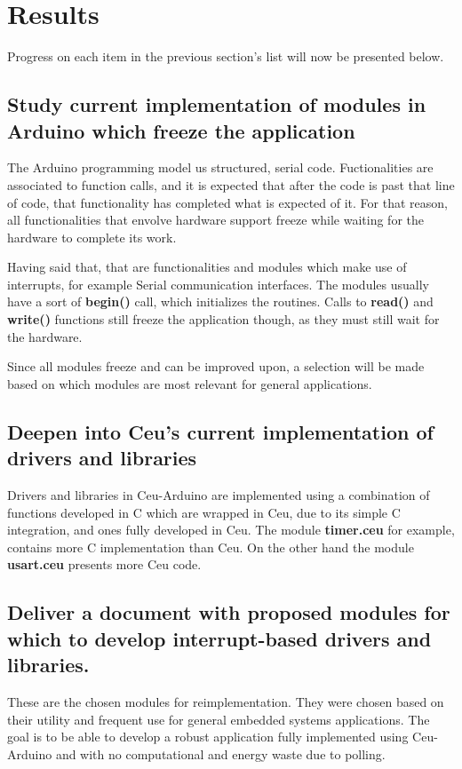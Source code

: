 \documentclass{article}
\begin{document}
\section{Results}
\tab Progress on each item in the previous section's list will now be presented below.
\subsection{Study current implementation of modules in Arduino which freeze the application}
\tab The Arduino programming model us structured, serial code. Fuctionalities are associated to function calls, and it is expected that after the code is past that line of code, that functionality has completed what is expected of it. For that reason, all functionalities that envolve hardware support freeze while waiting for the hardware to complete its work.
\par Having said that, that are functionalities and modules which make use of interrupts, for example Serial communication interfaces. The modules usually have a sort of \textbf{begin()} call, which initializes the routines. Calls to \textbf{read()} and \textbf{write()} functions still freeze the application though, as they must still wait for the hardware.
\par Since all modules freeze and can be improved upon, a selection will be made based on which modules are most relevant for general applications.
\subsection{Deepen into Ceu's current implementation of drivers and libraries}
\tab Drivers and libraries in Ceu-Arduino are implemented using a combination of functions developed in C which are wrapped in Ceu, due to its simple C integration, and ones fully developed in Ceu. The module \textbf{timer.ceu} for example, contains more C implementation than Ceu. On the other hand the module \textbf{usart.ceu} presents more Ceu code.
\subsection{Deliver a document with proposed modules for which to develop interrupt-based drivers and libraries.}
\tab These are the chosen modules for reimplementation. They were chosen based on their utility and frequent use for general embedded systems applications. The goal is to be able to develop a robust application fully implemented using Ceu-Arduino and with no computational and energy waste due to polling.
\end{document}
